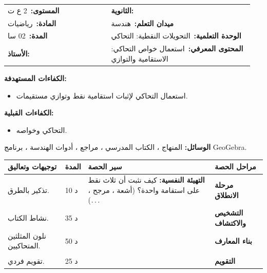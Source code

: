 \documentclass[12pt,a4paper]{article}
\makeatletter
\newenvironment{LTR}{\begin{otherlanguage}{english}}{\end{otherlanguage}}
\newcommand{\ar}[1]{\foreignlanguage{arabic}{#1}}
\renewcommand{\ldots}{\mathinner{\ldotp\ldotp\ldotp}}
\newcommand{\Phase}[1]{\textbf{#1}}
\newcommand{\Fld}[2]{\textbf{#1:}\ #2}
\newcommand{\ModhHead}[9]{%
\begin{LTR}
\begin{tcolorbox}[enhanced,colback=white,colframe=cThm!85!black,arc=4mm,boxrule=1pt,top=14pt,bottom=6pt,left=8pt,right=8pt,
 overlay={\node[fill=cThm!85!black,text=white,rounded corners=3mm,inner xsep=14pt,inner ysep=4pt,font=\large\bfseries] at ([yshift=0pt]frame.north){\ar{مذكرة رقم #1}};},
 before upper={\selectlanguage{arabic}}]
\begin{tabular}{@{}p{0.4\linewidth}p{0.55\linewidth}@{}}
\Fld{المستوى}{#2} & \Fld{الثانوية}{\dotfill}\\[3pt]
\Fld{المادة}{رياضيات} & \Fld{ميدان التعلم}{#3}\\[3pt]
\Fld{المدة}{#5} & \Fld{الوحدة التعلمية}{#4}\\[3pt]
\Fld{الأستاذ}{\dotfill} & \Fld{المحتوى المعرفي}{#6}\\
\end{tabular}
\end{tcolorbox}
\begin{tcolorbox}[enhanced,colback=white,colframe=cThm!85!black,arc=3mm,boxrule=0.8pt,sidebyside,sidebyside align=top,lefthand ratio=0.5,
 segmentation style={dashed,cThm!60},before upper={\selectlanguage{arabic}},before lower={\selectlanguage{arabic}}]
\textbf{الكفاءات المستهدفة:}\par #8
\tcblower
\textbf{الكفاءات القبلية:}\par #7
\end{tcolorbox}
\end{LTR}
\par\smallskip\textbf{الوسائل:} #9\par\smallskip}
\newenvironment{Sayr}{%
\begin{LTR}\renewcommand{\arraystretch}{1.25}
\begin{longtable}{|p{0.17\textwidth}|>{\centering\arraybackslash}p{0.06\textwidth}|p{0.53\textwidth}|>{\centering\arraybackslash}p{0.12\textwidth}|}
\hline\rowcolor{cThm!12}\ar{\textbf{توجيهات وتعاليق}} & \ar{\textbf{المدة}} & \ar{\textbf{سير الحصة}} & \ar{\textbf{مراحل الحصة}}\\\hline\endhead
\hline\endfoot}{\end{longtable}\end{LTR}}
\newcommand{\Row}[4]{\ar{\small #4} & \ar{#3} & \ar{#2} & \cellcolor{cThm!8}\ar{\Phase{#1}}\\\hline}
\newcommand{\Lab}[2]{\foreignlanguage{english}{\tcbox[on line,colback=#1,colframe=#1,boxrule=0pt,arc=2pt,boxsep=1pt,left=5pt,right=5pt,top=1pt,bottom=1pt]{\ar{\textcolor{white}{\textbf{#2}}}}}}
\newcommand{\ck}{\ensuremath{{\color{cRem}\checkmark}}}
\makeatother
\begin{document}
\newpage
\ModhHead{45}{2 ع ت}{هندسة}{التحويلات النقطية: التحاكي}{02 سا}{استعمال خواص التحاكي: الاستقامية والتوازي}%
{\begin{itemize}\item التحاكي وخواصه.\end{itemize}}%
{\begin{itemize}\item استعمال التحاكي لإثبات استقامية نقط وتوازي مستقيمات.\end{itemize}}%
{المنهاج ، الكتاب المدرسي ، مراجع ، أدوات الهندسة ، برنامج GeoGebra.}
\begin{Sayr}
\Row{مرحلة الانطلاق}{%
\textbf{التهيئة النفسية:} كيف نثبت أن ثلاث نقط على استقامة واحدة؟ (أشعة ، مرجح ، $\ldots$)}{10 د}{تذكير بالطرق.}
\Row{التشخيص والاكتشاف}{%
\Lab{cEx}{مناقشة نشاط 03 صفحة 313}\par\ck\ مثلث $ABC$ ومستقيمات موازية لأضلاعه: نعبّر عن نقطة كمرجح ، ثم نقارن مساحتي مثلثين متحاكيين.\par
}{35 د}{نشاط الكتاب.}
\Row{بناء المعارف}{%
\Lab{cThm}{استقامية}\ النقطة $O$ وأي نقطة $M$ وصورتها $M_1$ بتحاكٍ مركزه $O$ على استقامة واحدة.\par\Lab{cEx}{مركز الثقل}\ $ABC$ مثلث مركز ثقله $G$ ، و $A_1$ ، $B_1$ ، $C_1$ منتصفات $[BC]$ ، $[CA]$ ، $[AB]$.\par\ck\ $\overrightarrow{GA_1}=-\frac12\overrightarrow{GA}$: التحاكي $h(G;-\frac12)$ يحول $A$ إلى $A_1$ ، $B$ إلى $B_1$ ، $C$ إلى $C_1$.\par
\ck\ إذن $(A_1B_1)\parallel(AB)$ و $A_1B_1=\frac12AB$.\par
}{50 د}{نلون المثلثين المتحاكيين.}
\Row{}{%
\Lab{cMeth}{تعيين مركز تحاكٍ}\ إذا كانت $[AB]$ و $[CD]$ متوازيتين وغير متقايستين ، فمركز التحاكي الذي يحول $A$ إلى $C$ و $B$ إلى $D$ هو نقطة تقاطع $(AC)$ و $(BD)$.\par\Lab{cThm!80!black}{حذار}\ نتحقق من النسبة بإشارتها (نفس الاتجاه $k>0$).}{}{}
\Row{التقويم}{%
\Lab{cEx}{تطبيق}\par $ABCD$ شبه منحرف قاعدتاه $[AB]$ و $[CD]$ مع $\overrightarrow{DC}=\frac13\overrightarrow{AB}$ ، والمستقيمان $(AD)$ و $(BC)$ يتقاطعان في $E$. عيّن تحاكياً يحول $A$ إلى $D$ و $B$ إلى $C$.\par\textbf{الحل:} مركزه $E$ ونسبته $\frac13$ لأن $\overrightarrow{DC}=\frac13\overrightarrow{AB}$.\par\textbf{واجب منزلي:} تمارين 38 ، 39 ، 40 ، 42 ، 43 ، 44 ، 46 ، 47 من باب التحويلات.\par\smallskip\textbf{ملاحظات حول سير الحصة:} \dotfill}{25 د}{تقويم فردي.}
\end{Sayr}
\end{document}
